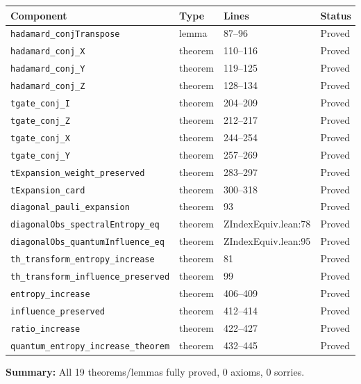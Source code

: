 \documentclass[11pt,a4paper]{article}
\theoremstyle{definition}
\theoremstyle{plain}
\begin{document}
\begin{center}
\begin{tabular}{llll}
\toprule
\textbf{Component} & \textbf{Type} & \textbf{Lines} & \textbf{Status} \\
\midrule
\texttt{hadamard\_conjTranspose} & lemma & 87--96 & Proved \\
\texttt{hadamard\_conj\_X} & theorem & 110--116 & Proved \\
\texttt{hadamard\_conj\_Y} & theorem & 119--125 & Proved \\
\texttt{hadamard\_conj\_Z} & theorem & 128--134 & Proved \\
\texttt{tgate\_conj\_I} & theorem & 204--209 & Proved \\
\texttt{tgate\_conj\_Z} & theorem & 212--217 & Proved \\
\texttt{tgate\_conj\_X} & theorem & 244--254 & Proved \\
\texttt{tgate\_conj\_Y} & theorem & 257--269 & Proved \\
\texttt{tExpansion\_weight\_preserved} & theorem & 283--297 & Proved \\
\texttt{tExpansion\_card} & theorem & 300--318 & Proved \\
\texttt{diagonal\_pauli\_expansion} & theorem & 93 & Proved \\
\texttt{diagonalObs\_spectralEntropy\_eq} & theorem & ZIndexEquiv.lean:78 & Proved \\
\texttt{diagonalObs\_quantumInfluence\_eq} & theorem & ZIndexEquiv.lean:95 & Proved \\
\texttt{th\_transform\_entropy\_increase} & theorem & 81 & Proved \\
\texttt{th\_transform\_influence\_preserved} & theorem & 99 & Proved \\
\texttt{entropy\_increase} & theorem & 406--409 & Proved \\
\texttt{influence\_preserved} & theorem & 412--414 & Proved \\
\texttt{ratio\_increase} & theorem & 422--427 & Proved \\
\texttt{quantum\_entropy\_increase\_theorem} & theorem & 432--445 & Proved \\
\bottomrule
\end{tabular}
\end{center}

\vspace{1em}
\textbf{Summary:} All 19 theorems/lemmas fully proved, 0 axioms, 0 sorries.
\end{document}
